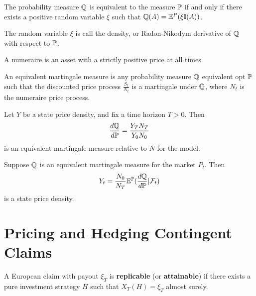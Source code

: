 \begin{thm}
  \label{sec:arbitrage-theory-18}
  The probability measure $\Q$ is equivalent to the measure $\Prob$ if
  and only if there exists a positive random variable $\xi$ such that
  $\Q{A} = \E^{P}(\xi \I{A})$.

  The random variable $\xi$ is call the density, or Radon-Nikodym
  derivative of $\Q$ with respect to $\Prob$.
\end{thm}

\begin{defn}
  \label{sec:arbitrage-theory-19}
  A numeraire is an asset with a strictly positive price at all times.
\end{defn}

\begin{defn}
  \label{sec:arbitrage-theory-20}
  An equivalent martingale measure is any probability measure $\Q$
  equivalent opt $\Prob$ such that the discounted price process
  $\frac{S_{t}}{N_{t}}$ is a martingale under $\Q$, where $N_{t}$ is
  the numeraire price process.
\end{defn}

\begin{defn}
  \label{sec:arbitrage-theory-21}
  Let $Y$ be a state price density, and fix a time horizon $T > 0$.
  Then
  \begin{equation}
    \label{eq:4}
    \frac{d\Q}{d\Prob} = \frac{Y_{T} N_{T}}{Y_{0} N_{0}}
  \end{equation}
  is an equivalent martingale measure relative to $N$ for the model.
\end{defn}

\begin{defn}
  \label{sec:arbitrage-theory-22}
  Suppose $\Q$ is an equivalent martingale measure for the market
  $P_{t}$. Then
  \begin{equation}
    \label{eq:5}
    Y_{t} = \frac{N_{0}}{N_{T}}  \E^{\Prob}(\frac{d\Q}{d\Prob} | \mathcal{F}_{t})
  \end{equation} is a state price density.
\end{defn}

\section{Pricing and Hedging Contingent Claims}
\label{sec:pric-hedg-cont}

\begin{defn}
  \label{sec:pric-hedg-cont-1}
  A European claim with payout $\xi_{T}$ is \textbf{replicable} (or
  \textbf{attainable}) if there exists a pure investment strategy $H$
  such that $X_{T}(H) = \xi_{T}$ almost surely.
\end{defn}


